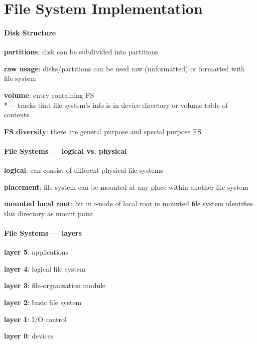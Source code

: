 \section{File System Implementation}

\paragraph{Disk Structure}
\begin{items}
  \item \textbf{partitions}: disk can be subdivided into partitions
  \item \textbf{raw usage}: disks/partitions can be used raw (unformatted) or formatted with file system
  \item \textbf{volume}: entry containing FS \\*
    $ - $ tracks that file system's info is in device directory or volume table of contents
  \item \textbf{FS diversity}: there are general purpose and special purpose FS
\end{items}

\paragraph{File Systems --- logical vs. physical}
\begin{items}
  \item \textbf{logical}: can consist of different physical file systems
  \item \textbf{placement}: file system can be mounted at any place within another file system
  \item \textbf{mounted local root}: bit in i-node of local root in mounted file system identifies this directory as mount point
\end{items}

\paragraph{File Systems --- layers}
\begin{items}
  \item \textbf{layer 5}: applications
  \item \textbf{layer 4}: logical file system
  \item \textbf{layer 3}: file-organization module
  \item \textbf{layer 2}: basic file system
  \item \textbf{layer 1}: I/O control
  \item \textbf{layer 0}: devices
\end{items}

